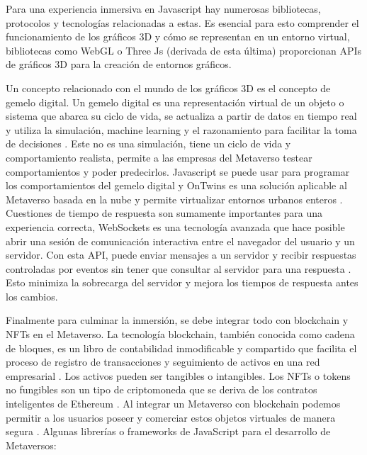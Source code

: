 \documentclass[a4paper,10pt]{article}
\begin{document}
{\begin{itemize}
		\end{itemize}	
		Para una experiencia inmersiva en Javascript hay numerosas bibliotecas, protocolos y tecnologías relacionadas a estas. Es esencial para esto comprender el funcionamiento de los gráficos 3D y cómo se representan en un entorno virtual, bibliotecas como WebGL o Three Js (derivada de esta última) proporcionan APIs de gráficos 3D para la creación de entornos gráficos.\par
		Un concepto relacionado con el mundo de los gráficos 3D es el concepto de gemelo digital. Un gemelo digital es una representación virtual de un objeto o sistema que abarca su ciclo de vida, se actualiza a partir de datos en tiempo real y utiliza la simulación, machine learning y el razonamiento para facilitar la toma de decisiones \parencite{ibm-digitaltwin-2023}. Este no es una simulación, tiene un ciclo de vida y comportamiento realista, permite a las empresas del Metaverso testear comportamientos y poder predecirlos. Javascript se puede usar para programar los comportamientos del gemelo digital y OnTwins es una solución aplicable al Metaverso basada en la nube y permite virtualizar entornos urbanos enteros \parencite{ontwins-2023}.
		Cuestiones de tiempo de respuesta son sumamente importantes para una experiencia correcta, WebSockets es una tecnología avanzada que hace posible abrir una sesión de comunicación interactiva entre el navegador del usuario y un servidor. Con esta API, puede enviar mensajes a un servidor y recibir respuestas controladas por eventos sin tener que consultar al servidor para una respuesta \parencite{mozilla-websockets-2023}. Esto minimiza la sobrecarga del servidor y mejora los tiempos de respuesta antes los cambios.\par
		Finalmente para culminar la inmersión, se debe integrar todo con blockchain y NFTs en el Metaverso. La tecnología blockchain, también conocida como cadena de bloques, es un libro de contabilidad inmodificable y compartido que facilita el proceso de registro de transacciones y seguimiento de activos en una red empresarial \parencite{ibm-blockchain-2023}. Los activos pueden ser tangibles o intangibles. Los NFTs o tokens no fungibles son un tipo de criptomoneda que se deriva de los contratos inteligentes de Ethereum \parencite{wang2021non}. Al integrar un Metaverso con blockchain podemos permitir a los usuarios poseer y comerciar estos objetos virtuales de manera segura \parencite{iebs-business-school-2023}.
		Algunas librerías o frameworks de JavaScript para el desarrollo de Metaversos:
		\begin{itemize}

\end{itemize}}
\end{document}

